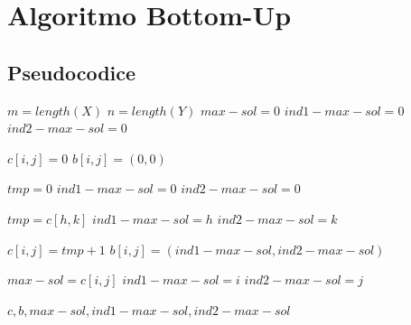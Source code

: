 \newpage
\section{Algoritmo Bottom-Up}
\subsection{Pseudocodice}
\begin{algorithm}
    \caption{LICS-LENGTH}
    \begin{algorithmic}
            \State $m=length(X)$
            \State $n=length(Y)$
            \State $max-sol=0$
            \State $ind1-max-sol=0$
            \State $ind2-max-sol=0$

                     
                        \State $c[i,j]=0$
                        \State $b[i,j]=(0,0)$

                        \Else
                            \State $tmp=0$
                            \State $ind1-max-sol=0$
                            \State $ind2-max-sol=0$

                                        \State $tmp=c[h,k]$
                                        \State $ind1-max-sol = h$
                                        \State $ind2-max-sol=k$
                                    \EndIf
                                    
                                    \State $c[i,j] = tmp + 1$
                                    \State $b[i,j] = (ind1-max-sol, ind2-max-sol)$ 

                                        \State $max-sol=c[i,j]$
                                        \State $ind1-max-sol = i$
                                        \State $ind2-max-sol = j$
                                    \EndIf
                                \EndFor
                            \EndFor
                    \EndIf
                \EndFor
            \EndFor

            \State \Return $c,b,max-sol,ind1-max-sol,ind2-max-sol$
        \EndProcedure
    \end{algorithmic}
\end{algorithm}
